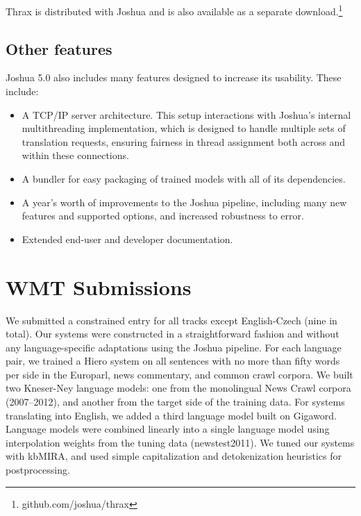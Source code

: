 \documentclass[11pt]{article}
\begin{document}
Thrax is distributed with Joshua and is also available as a separate
download.\footnote{github.com/joshua/thrax}

\subsection{Other features}
\label{sec:other}

Joshua 5.0 also includes many features designed to increase its
usability.  These include:

\begin{itemize}
\item A TCP/IP server architecture.  This setup interactions with
  Joshua's internal multithreading implementation, which is designed
  to handle multiple sets of translation requests, ensuring fairness
  in thread assignment both across and within these connections.
\item A bundler for easy packaging of trained models with
  all of its dependencies.
\item A year's worth of improvements to the Joshua pipeline, including many
  new features and supported options, and increased robustness to error.
\item Extended end-user and developer documentation.
\end{itemize}


\section{WMT Submissions}

We submitted a constrained entry for all tracks except English-Czech
(nine in total). Our systems were constructed in a straightforward
fashion and without any language-specific adaptations using the Joshua
pipeline. For each language pair, we trained a Hiero system on all
sentences with no more than fifty words per side in the Europarl, news
commentary, and common crawl corpora. We built two Kneser-Ney language
models: one from the monolingual News Crawl corpora (2007--2012), and
another from the target side of the training data.  For systems
translating into English, we added a third language model built on
Gigaword. Language models were combined linearly into a single
language model using interpolation weights from the tuning data
(newstest2011).  We tuned our systems with kbMIRA, and used simple
capitalization and detokenization heuristics for postprocessing.
\end{document}
